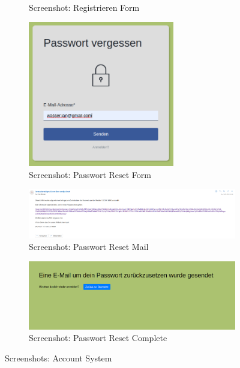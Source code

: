\begin{figure}[htp]
\begin{subfigure}[b]{0.32\textwidth}
        \caption{Screenshot: Registrieren Form}
        \label{fig:r-register}
    \end{subfigure}
    \begin{subfigure}[b]{0.32\textwidth}
        \centering
        \includegraphics[width=0.7\textwidth]{images/Auth3.png}
        \caption{Screenshot: Passwort Reset Form}
        \label{fig:r-reset}
    \end{subfigure}
    \begin{subfigure}[b]{\textwidth}
        \centering
        \includegraphics[width=\textwidth]{images/Auth4.png}
        \caption{Screenshot: Passwort Reset Mail}
        \label{fig:r-reset-mail}
    \end{subfigure}
    \begin{subfigure}[b]{\textwidth}
        \centering
        \includegraphics[width=\textwidth]{images/Auth5.png}
        \caption{Screenshot: Passwort Reset Complete}
        \label{fig:r-reset-complete}
    \end{subfigure}
    \caption{Screenshots: Account System}
    \label{fig:r-auth}
\end{figure} 

